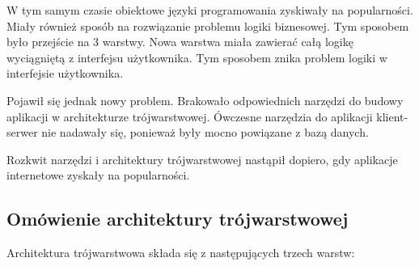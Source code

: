 \documentclass[a4paper,onecolumn,oneside,11pt,wide,floatssmall]{mwrep}
\theoremstyle{definition}
\theoremstyle{plain}%
\theoremstyle{remark}
\begin{document}
W tym samym czasie obiektowe języki programowania zyskiwały na popularności. Miały również sposób na rozwiązanie 
problemu logiki biznesowej. Tym sposobem było przejście na 3 warstwy. Nowa warstwa miała zawierać całą logikę 
wyciągniętą z interfejsu użytkownika. Tym sposobem znika problem logiki w interfejsie użytkownika.

Pojawił się jednak nowy problem. Brakowało odpowiednich narzędzi do budowy aplikacji w architekturze trójwarstwowej. 
Ówczesne narzędzia do aplikacji klient-serwer nie nadawały się, ponieważ były mocno powiązane z bazą danych. 

Rozkwit narzędzi i architektury trójwarstwowej nastąpił dopiero, gdy aplikacje internetowe zyskały na popularności.

\subsection{Omówienie architektury trójwarstwowej}

Architektura trójwarstwowa składa się z następujących trzech warstw:
\end{document}
